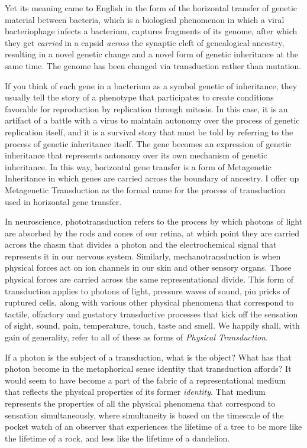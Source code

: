 \documentclass[runningheads]{llncs}
\begin{document}
Yet its meaning came to English in the form of the horizontal transfer of genetic material between bacteria, which is a biological phenomenon in which a viral bacteriophage infects a bacterium, captures fragments of its genome, after which they get \emph{carried} in a capsid \emph{across} the synaptic cleft of genealogical ancestry, resulting in a novel genetic change and a novel form of genetic inheritance at the same time. The genome has been changed via transduction rather than mutation\cite{Zinder1952}.

If you think of each gene in a bacterium as a symbol genetic of inheritance, they usually tell the story of a phenotype that participates to create conditions favorable for reproduction by replication through mitosis. In this case, it is an artifact of a battle with a virus to maintain autonomy over the process of genetic replication itself, and it is a survival story that must be told by referring to the process of genetic inheritance itself. The gene becomes an expression of genetic inheritance that represents autonomy over its own mechanism of genetic inheritance. In this way, horizontal gene transfer is a form of Metagenetic Inheritance in which genes are carried across the boundary of ancestry. I offer up Metagenetic Transduction as the formal name for the process of transduction used in horizontal gene transfer.

In neuroscience, phototransduction refers to the process by which photons of light are absorbed by the rods and cones of our retina, at which point they are carried across the chasm that divides a photon and the electrochemical signal that represents it in our nervous system. Similarly, mechanotransduction is when physical forces act on ion channels in our skin and other sensory organs. Those physical forces are carried across the same representational divide. This form of transduction applies to photons of light, pressure waves of sound, pin pricks of ruptured cells, along with various other physical phenomena that correspond to tactile, olfactory and gustatory transductive processes that kick off the sensation of sight, sound, pain, temperature, touch, taste and smell. We happily shall, with gain of generality, refer to all of these as forms of \emph{Physical Transduction}.

If a photon is the subject of a transduction, what is the object? What has that photon become in the metaphorical sense identity that transduction affords? It would seem to have become a part of the fabric of a representational medium that reflects the physical properties of its former \emph{identity}. That medium represents the properties of all the physical phenomena that correspond to sensation simultaneously, where simultaneity is based on the timescale of the pocket watch of an observer that experiences the lifetime of a tree to be more like the lifetime of a rock, and less like the lifetime of a dandelion.
\end{document}
